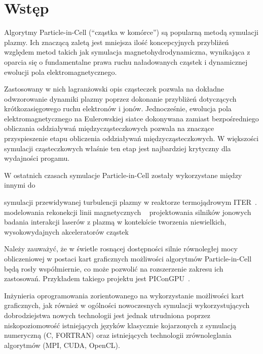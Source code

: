 \section[Wstęp]{Wstęp}\label{sec:intro} %
Algorytmy Particle-in-Cell (``cząstka w komórce'') są popularną metodą
symulacji plazmy. Ich znaczącą zaletą jest mniejsza ilość koncepcyjnych
przybliżeń względem metod takich jak symulacja magnetohydrodynamiczna,
wynikająca z oparcia się o fundamentalne prawa ruchu naładowanych
cząstek i dynamicznej ewolucji pola elektromagnetycznego.

Zastosowany w nich lagranżowski opis cząsteczek pozwala na dokładne
odwzorowanie dynamiki plazmy poprzez dokonanie przybliżeń dotyczących
krótkozasięgowego ruchu elektronów i jonów. Jednocześnie, ewolucja pola
elektromagnetycznego na Eulerowskiej siatce dokonywana zamiast bezpośredniego
obliczania oddziaływań międzycząsteczkowych pozwala na znaczące przyspieszenie
etapu obliczenia oddziaływań międzycząsteczkowych. W większości symulacji
cząsteczkowych właśnie ten etap jest najbardziej krytyczny dla wydajności
progamu.\cite{birdsall}

W ostatnich czasach symulacje Particle-in-Cell zostały wykorzystane między innymi do
\begin{itemize}
\itemi{} symulacji przewidywanej turbulencji plazmy w reaktorze termojądrowym ITER~\cite{pic-turbulence}.
\itemi{} modelowania rekonekcji linii magnetycznych ~\cite{pic-reconnection}
\itemi{} projektowania silników jonowych~\cite{pic-hallengine}
\itemi{} badania interakcji laserów z plazmą w kontekście tworzenia niewielkich,
    wysokowydajnych akceleratorów cząstek~\cite{pic-laserplasma}
\end{itemize}

Należy zauważyć, że w świetle rosnącej dostępności silnie równoległej mocy
obliczeniowej w postaci kart graficznych możliwości algorytmów Particle-in-Cell
będą rosły współmiernie, co może pozwolić na rozszerzenie zakresu ich
zastosowań. Przykładem takiego projektu jest PIConGPU~\cite{picongpu}.

Inżynieria oprogramowania zorientowanego na wykorzystanie możliwości kart
graficznych, jak również w ogólności nowoczesnych symulacji wykorzystujących
dobrodziejstwa nowych technologii jest jednak utrudniona poprzez
niskopoziomowość istniejących języków klasycznie kojarzonych z symulacją
numeryczną (C, FORTRAN) oraz istniejących technologii zrównoleglania algorytmów
(MPI, CUDA, OpenCL).

